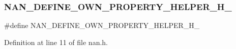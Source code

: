 \subsubsection{N\+A\+N\+\_\+\+D\+E\+F\+I\+N\+E\+\_\+\+O\+W\+N\+\_\+\+P\+R\+O\+P\+E\+R\+T\+Y\+\_\+\+H\+E\+L\+P\+E\+R\+\_\+\+H\+\_\+}
{\footnotesize\ttfamily \#define N\+A\+N\+\_\+\+D\+E\+F\+I\+N\+E\+\_\+\+O\+W\+N\+\_\+\+P\+R\+O\+P\+E\+R\+T\+Y\+\_\+\+H\+E\+L\+P\+E\+R\+\_\+\+H\+\_\+}



Definition at line 11 of file nan.\+h.

